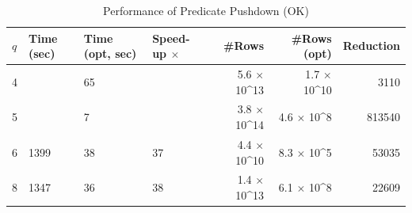 \begin{table}
  \caption{Performance of Predicate Pushdown (OK)}\label{tab:pushdown_ok}
  \begin{tabular}{l|p{5mm}p{5mm}p{7mm}|rrr}
    \toprule
    $q$ & Time (sec) & Time (opt, sec) & Speed-up $\times$ & \#Rows & \#Rows (opt) & Reduction \\
    \midrule
    4 &    &        65 &       &         5.6 $\times$ 10^{13}    &   1.7 $\times$ 10^{10} &   3110      \\
    5 &    &         7 &       &        3.8 $\times$ 10^{14}     &     4.6 $\times$ 10^8 &   813540      \\
    6 &  1399 &        38 &       37 &    4.4 $\times$ 10^{10} &        8.3 $\times$ 10^5 &      53035 \\
    8 &  1347 &        36 &       38 & 1.4 $\times$ 10^{13} &     6.1 $\times$ 10^8 &      22609 \\
    \bottomrule
  \end{tabular}
\end{table}
